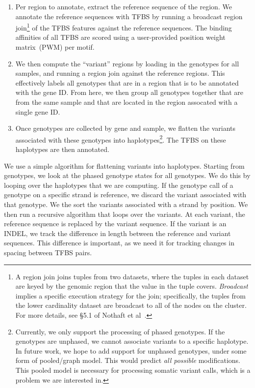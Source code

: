 \documentclass[11pt]{article}
\theoremstyle{plain}
\begin{document}
\begin{enumerate}
\item Per region to annotate, extract the reference sequence of the region. We annotate
the reference sequences with TFBS by running a broadcast region join\footnote{A region join
joins tuples from two datasets, where the tuples in each dataset are keyed by the genomic
region that the value in the tuple covers. \emph{Broadcast} implies a specific execution
strategy for the join; specifically, the tuples from the lower cardinality dataset are
broadcast to all of the nodes on the cluster. For more details, see \S5.1 of Nothaft et
al~\cite{nothaft15}.} of the TFBS features against the reference sequences. The binding
affinities of all TFBS are scored using a user-provided position weight matrix~(PWM) per motif.
\item We then compute the ``variant'' regions by loading in the genotypes for all samples,
and running a region join against the reference regions. This effectively labels all
genotypes that are in a region that is to be annotated with the gene ID. From here, we
then group all genotypes together that are from the same sample and that are located in
the region assocated with a single gene ID.
\item Once genotypes are collected by gene and sample, we flatten the variants associated
with these genotypes into haplotypes\footnote{Currently, we only support the processing of
phased genotypes. If the genotypes are unphased, we cannot associate variants to a specific
haplotype. In future work, we hope to add support for unphased genotypes, under some form
of pooled/graph model. This would predict \emph{all possible} modifications. This pooled
model is necessary for processing somatic variant calls, which is a problem we are
interested in.}. The TFBS on these haplotypes are then annotated.
\end{enumerate}

We use a simple algorithm for flattening variants into haplotypes. Starting from
genotypes, we look at the phased genotype states for all genotypes. We do this by
looping over the haplotypes that we are computing. If the genotype call of a genotype
on a specific strand is reference, we discard the variant associated with that
genotype. We the sort the variants associated with a strand by position. We then
run a recursive algorithm that loops over the variants. At each variant, the reference
sequence is replaced by the variant sequence. If the variant is an INDEL, we track the
difference in length between the reference and variant sequences. This difference is
important, as we need it for tracking changes in spacing between TFBS pairs.
\end{document}
